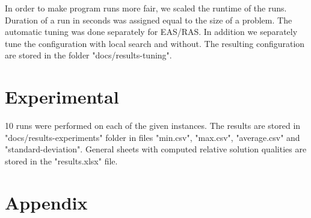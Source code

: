 \documentclass[12pt]{article}
\begin{document}
In order to make program runs more fair, we scaled the runtime of the runs. Duration of a run in seconds was assigned equal to the size of a problem. The automatic tuning was done separately for EAS/RAS. In addition we separately tune the configuration with local search and without. The resulting configuration are stored in the folder "docs/results-tuning".

\section{Experimental}

10 runs were performed on each of the given instances. The results are stored in "docs/results-experiments" folder in files "min.csv", "max.csv", "average.csv" and "standard-deviation". General sheets with computed relative solution qualities are stored in the "results.xlsx" file.


\section{Appendix}





\end{document}
